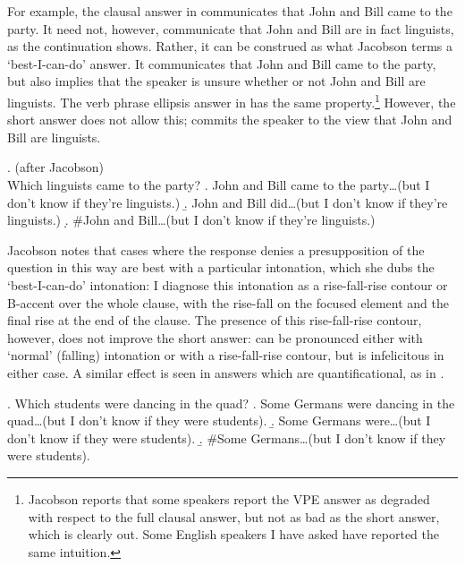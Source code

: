 \documentclass[doublespace]{umthesis}
\begin{document}
For example, the clausal answer in \Next[a] communicates that John and Bill came to the party. It need not, however, communicate that John and Bill are in fact linguists, as the continuation shows. Rather, it can be construed as what Jacobson terms a `best-I-can-do' answer. It communicates that John and Bill came to the party, but also implies that the speaker is unsure whether or not John and Bill are linguists. The verb phrase ellipsis answer in \Next[b] has the same property.\footnote{Jacobson reports that some speakers report the VPE answer as degraded with respect to the full clausal answer, but not as bad as the short answer, which is clearly out. Some English speakers I have asked have reported the same intuition.} However, the short answer does not allow this; \Next[c] commits the speaker to the view that John and Bill are linguists.

\ex. 		(after Jacobson)\\
		Which linguists came to the party?
		\a. {John and Bill} came to the party\ldots (but I don't know if they're linguists.)
		\b. John and Bill did\ldots (but I don't know if they're linguists.)
		\d. \#John and Bill\ldots (but I don't know if they're linguists.)

 Jacobson notes that cases where the response denies a presupposition of the question in this way are best with a particular intonation, which she dubs the `best-I-can-do' intonation: I diagnose this intonation as a rise-fall-rise contour or B-accent over the whole clause, with the rise-fall on the focused element and the final rise at the end of the clause. The presence of this rise-fall-rise contour, however, does not improve the short answer: \Last[c] can be pronounced either with `normal' (falling) intonation or with a rise-fall-rise contour, but is infelicitous in either case. A similar effect is seen in answers which are quantificational, as in \Next.

\ex.	Which students were dancing in the quad?
		\a. Some Germans were dancing in the quad\ldots (but I don't know if they were students).
		\b. Some Germans were\ldots (but I don't know if they were students).
		\b. \#Some Germans\ldots (but I don't know if they were students).
\end{document}
